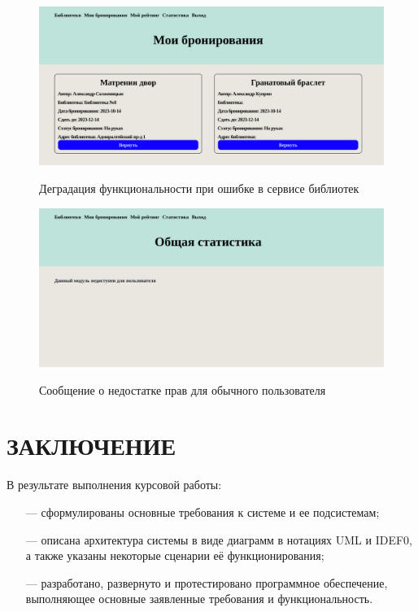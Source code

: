 \documentclass[a4paper, 12pt]{article}
\begin{document}
\begin{large}
\newpage
\begin{figure}[h!]
	\begin{center}
		{\includegraphics[scale = 0.2]{degradation}}
		\caption{Деградация функциональности при ошибке в сервисе библиотек}
		\label{fig:degradation}
	\end{center}
\end{figure}

\begin{figure}[h!]
	\begin{center}
		{\includegraphics[scale = 0.2]{roles}}
		\caption{Сообщение о недостатке прав для обычного пользователя}
		\label{fig:roles}
	\end{center}
\end{figure}


\newpage
\titleformat{\section}[block]
{\bfseries\large\center}{\thesection}{1em}{}
\section*{ЗАКЛЮЧЕНИЕ}
В результате выполнения курсовой работы: 
\begin{itemize}
    \item[---] сформулированы основные требования к системе и ее подсистемам;
    \item[---] описана архитектура системы в виде диаграмм в нотациях UML и IDEF0, а также указаны некоторые сценарии её функционирования;
    \item[---] разработано, развернуто и протестировано программное обеспечение, выполняющее основные заявленные требования и функциональность.
\end{itemize}


\end{large}
\end{document}
